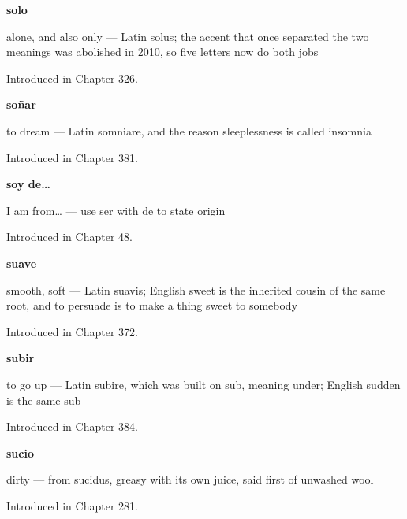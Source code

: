 \noindent\begin{minipage}[t]{\linewidth}
\raggedright
\textbf{solo}\par
\small alone, and also only — Latin solus; the accent that once separated the two meanings was abolished in 2010, so five letters now do both jobs\par
\footnotesize Introduced in Chapter 326.
\end{minipage}\par\medskip

\noindent\begin{minipage}[t]{\linewidth}
\raggedright
\textbf{soñar}\par
\small to dream — Latin somniare, and the reason sleeplessness is called insomnia\par
\footnotesize Introduced in Chapter 381.
\end{minipage}\par\medskip

\noindent\begin{minipage}[t]{\linewidth}
\raggedright
\textbf{soy de…}\par
\small I am from… — use ser with de to state origin\par
\footnotesize Introduced in Chapter 48.
\end{minipage}\par\medskip

\noindent\begin{minipage}[t]{\linewidth}
\raggedright
\textbf{suave}\par
\small smooth, soft — Latin suavis; English sweet is the inherited cousin of the same root, and to persuade is to make a thing sweet to somebody\par
\footnotesize Introduced in Chapter 372.
\end{minipage}\par\medskip

\noindent\begin{minipage}[t]{\linewidth}
\raggedright
\textbf{subir}\par
\small to go up — Latin subire, which was built on sub, meaning under; English sudden is the same sub-\par
\footnotesize Introduced in Chapter 384.
\end{minipage}\par\medskip

\noindent\begin{minipage}[t]{\linewidth}
\raggedright
\textbf{sucio}\par
\small dirty — from sucidus, greasy with its own juice, said first of unwashed wool\par
\footnotesize Introduced in Chapter 281.
\end{minipage}\par\medskip

